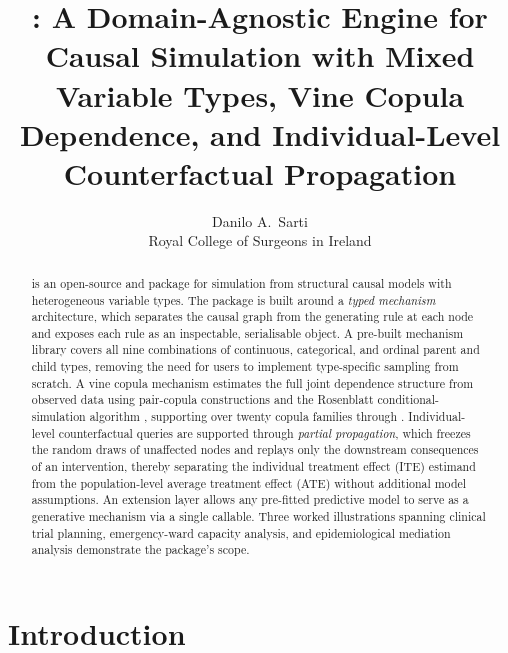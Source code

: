 \documentclass[article]{jss}
\title{\pkg{lepidoptera}: A Domain-Agnostic Engine for Causal Simulation
  with Mixed Variable Types, Vine Copula Dependence,
  and Individual-Level Counterfactual Propagation}
\author{Danilo A.~Sarti\\
        Royal College of Surgeons in Ireland}
\begin{document}
\maketitle

\begin{abstract}
 is an open-source  and  package
for simulation from structural causal models with heterogeneous variable types.
The package is built around a \emph{typed mechanism} architecture, which separates
the causal graph from the generating rule at each node and exposes each rule as an
inspectable, serialisable object. A pre-built mechanism library covers all nine
combinations of continuous, categorical, and ordinal parent and child types,
removing the need for users to implement type-specific sampling from scratch. A
vine copula mechanism estimates the full joint dependence structure from observed
data using pair-copula constructions \citep{bedford2002vines, aas2009pair} and the
Rosenblatt conditional-simulation algorithm \citep{rosenblatt1952remarks},
supporting over twenty copula families through 
\citep{nagler2022rvinecopulib}. Individual-level counterfactual queries are
supported through \emph{partial propagation}, which freezes the random draws of
unaffected nodes and replays only the downstream consequences of an intervention,
thereby separating the individual treatment effect (ITE) estimand from the
population-level average treatment effect (ATE) without additional model
assumptions. An extension layer allows any pre-fitted predictive model to serve as
a generative mechanism via a single callable. Three worked illustrations spanning
clinical trial planning, emergency-ward capacity analysis, and epidemiological
mediation analysis demonstrate the package's scope.
\end{abstract}

\section{Introduction}
\label{sec:intro}
\end{document}
